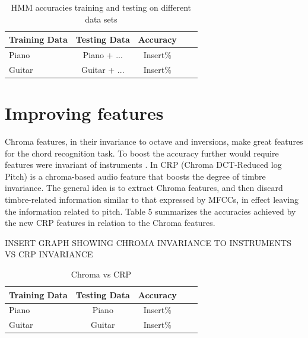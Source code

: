 \documentclass{article}
\begin{document}
\begin{table}[t]
\caption{HMM accuracies training and testing on different data sets}
\label{hmmacc}
\vskip 0.15in
\begin{center}
\begin{small}
\begin{sc}
\begin{tabular}{lcccr}
\hline
\abovespace\belowspace
Training Data & Testing Data & Accuracy \\
\hline
\abovespace
Piano  & Piano + ... & Insert\%\\
Guitar & Guitar + ... & Insert\%\\
\hline
\end{tabular}
\end{sc}
\end{small}
\end{center}
\vskip -0.1in
\end{table}

\section{Improving features}

Chroma features, in their invariance to octave and inversions, make great features for the chord recognition task. To boost the accuracy further would require features were invariant of instruments \cite{jiang}. In CRP (Chroma DCT-Reduced log Pitch) is a chroma-based audio feature that boosts the degree of timbre invariance. The general idea is to extract Chroma features, and then discard timbre-related information similar to that expressed by MFCCs, in effect leaving the information related to pitch. Table 5 summarizes the accuracies achieved by the new CRP features in relation to the Chroma features.

INSERT GRAPH SHOWING CHROMA INVARIANCE TO INSTRUMENTS VS CRP INVARIANCE

\begin{table}[t]
\caption{Chroma vs CRP}
\label{chromavscrp}
\vskip 0.15in
\begin{center}
\begin{small}
\begin{sc}
\begin{tabular}{lcccr}
\hline
\abovespace\belowspace
Training Data & Testing Data & Accuracy \\
\hline
\abovespace
Piano  & Piano  & Insert\%\\
Guitar & Guitar  & Insert\%\\
\hline
\end{tabular}
\end{sc}
\end{small}
\end{center}
\vskip -0.1in
\end{table}
\end{document}
